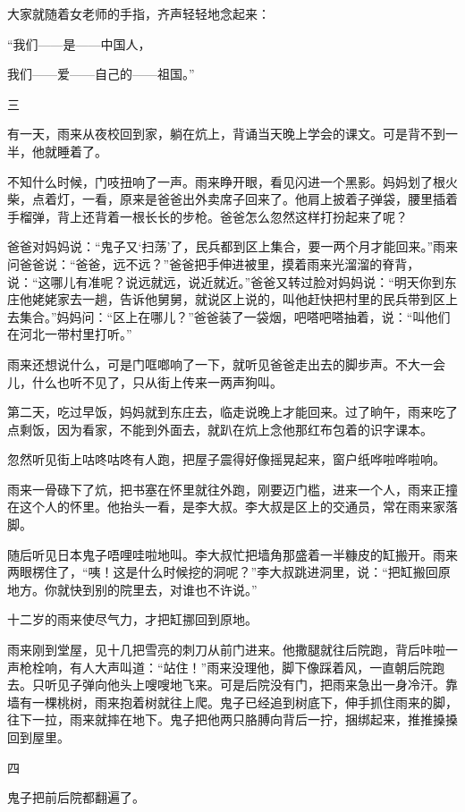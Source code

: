 \documentclass[12pt,UTF-8,openany]{ctexbook}
\begin{document}
\begin{large}
    大家就随着女老师的手指，齐声轻轻地念起来：
    
    “我们——是——中国人，
    
    我们——爱——自己的——祖国。”
    
    三
    
    有一天，雨来从夜校回到家，躺在炕上，背诵当天晚上学会的课文。可是背不到一半，他就睡着了。
    
    不知什么时候，门吱扭响了一声。雨来睁开眼，看见闪进一个黑影。妈妈划了根火柴，点着灯，一看，原来是爸爸出外卖席子回来了。他肩上披着子弹袋，腰里插着手榴弹，背上还背着一根长长的步枪。爸爸怎么忽然这样打扮起来了呢？
    
    爸爸对妈妈说：“鬼子又‘扫荡’了，民兵都到区上集合，要一两个月才能回来。”雨来问爸爸说：“爸爸，远不远？”爸爸把手伸进被里，摸着雨来光溜溜的脊背，说：“这哪儿有准呢？说远就远，说近就近。”爸爸又转过脸对妈妈说：“明天你到东庄他姥姥家去一趟，告诉他舅舅，就说区上说的，叫他赶快把村里的民兵带到区上去集合。”妈妈问：“区上在哪儿？”爸爸装了一袋烟，吧嗒吧嗒抽着，说：“叫他们在河北一带村里打听。”
    
    雨来还想说什么，可是门哐啷响了一下，就听见爸爸走出去的脚步声。不大一会儿，什么也听不见了，只从街上传来一两声狗叫。
    
    第二天，吃过早饭，妈妈就到东庄去，临走说晚上才能回来。过了晌午，雨来吃了点剩饭，因为看家，不能到外面去，就趴在炕上念他那红布包着的识字课本。
    
    忽然听见街上咕咚咕咚有人跑，把屋子震得好像摇晃起来，窗户纸哗啦哗啦响。
    
    雨来一骨碌下了炕，把书塞在怀里就往外跑，刚要迈门槛，进来一个人，雨来正撞在这个人的怀里。他抬头一看，是李大叔。李大叔是区上的交通员，常在雨来家落脚。
    
    随后听见日本鬼子唔哩哇啦地叫。李大叔忙把墙角那盛着一半糠皮的缸搬开。雨来两眼楞住了，“咦！这是什么时候挖的洞呢？”李大叔跳进洞里，说：“把缸搬回原地方。你就快到别的院里去，对谁也不许说。”
    
    十二岁的雨来使尽气力，才把缸挪回到原地。
    
    雨来刚到堂屋，见十几把雪亮的刺刀从前门进来。他撒腿就往后院跑，背后咔啦一声枪栓响，有人大声叫道：“站住！”雨来没理他，脚下像踩着风，一直朝后院跑去。只听见子弹向他头上嗖嗖地飞来。可是后院没有门，把雨来急出一身冷汗。靠墙有一棵桃树，雨来抱着树就往上爬。鬼子已经追到树底下，伸手抓住雨来的脚，往下一拉，雨来就摔在地下。鬼子把他两只胳膊向背后一拧，捆绑起来，推推搡搡回到屋里。
    
    四
    
    鬼子把前后院都翻遍了。
    

\end{large}
\end{document}
